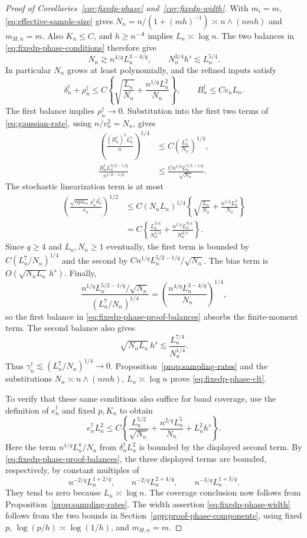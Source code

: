 \documentclass[10pt]{book}
\numberwithin{equation}{section}
\begin{document}
\begin{proof}[Proof of Corollaries~\ref{cor:fixedp-phase} and~\ref{cor:fixedp-width}]
With $m_i=m$, \eqref{eq:effective-sample-size} gives
$N_n=n/(1+(mh)^{-1})\asymp n\wedge(nmh)$ and $m_{H,n}=m$.
Also $K_n\le C$, and $h\ge n^{-A}$ implies $L_n\asymp\log n$.
The two balances in \eqref{eq:fixedp-phase-conditions} therefore give
\begin{equation}
N_n\gtrsim n^{4/q}L_n^{3-4/q},\qquad
N_n^{3/4}h^s\lesssim L_n^{5/4}.
\label{eq:fixedp-phase-proof-balances}
\end{equation}
In particular $N_n$ grows at least polynomially, and the refined inputs
satisfy
\[
\delta_n^\dagger+\rho_n^\dagger
\le C\left\{\sqrt{\frac{L_n}{N_n}}
+\frac{n^{1/q}L_n^2}{N_n}\right\},\qquad
B_n^\dagger\le Cv_nL_n.
\]
The first balance implies $\rho_n^\dagger\to0$.
Substitution into the first two terms of
\eqref{eq:gaussian-rate}, using $n/v_n^2=N_n$, gives
\begin{align*}
\left(\frac{(B_n^\dagger)^2L_n^5}{n}\right)^{1/4}
&\le C\left(\frac{L_n^7}{N_n}\right)^{1/4},\\
\frac{B_n^\dagger L_n^{3/2-1/q}}{n^{1/2-1/q}}
&\le\frac{Cn^{1/q}L_n^{5/2-1/q}}{\sqrt{N_n}}.
\end{align*}
The stochastic linearization term is at most
\[
\begin{aligned}
\left(\frac{\sqrt{npL_n}\,
\rho_n^\dagger\delta_n^\dagger}{v_n}\right)^{1/2}
&\le C(N_nL_n)^{1/4}
\left\{\sqrt{\frac{L_n}{N_n}}
+\frac{n^{1/q}L_n^2}{N_n}\right\}\\
&=C\left\{\frac{L_n^{3/4}}{N_n^{1/4}}
+\frac{n^{1/q}L_n^{9/4}}{N_n^{3/4}}\right\}.
\end{aligned}
\]
Since $q\ge4$ and $L_n,N_n\ge1$ eventually, the first term is bounded
by $C(L_n^7/N_n)^{1/4}$ and the second by
$Cn^{1/q}L_n^{5/2-1/q}/\sqrt{N_n}$. The bias term is
$O(\sqrt{N_nL_n}\,h^s)$. Finally,
\[
\frac{n^{1/q}L_n^{5/2-1/q}/\sqrt{N_n}}
{(L_n^7/N_n)^{1/4}}
=\left(\frac{n^{4/q}L_n^{3-4/q}}{N_n}\right)^{1/4},
\]
so the first balance in \eqref{eq:fixedp-phase-proof-balances} absorbs
the finite-moment term. The second balance also gives
\[
\sqrt{N_nL_n}\,h^s
\lesssim\frac{L_n^{7/4}}{N_n^{1/4}}.
\]
Thus $\gamma_n^\dagger\lesssim(L_n^7/N_n)^{1/4}\to0$.
Proposition~\ref{prop:sampling-rates} and the substitutions
$N_n\asymp n\wedge(nmh)$, $L_n\asymp\log n$ prove
\eqref{eq:fixedp-phase-clt}.

To verify that these same conditions also suffice for band coverage,
use the definition of $e_n^\dagger$ and fixed $p,K_n$ to obtain
\[
e_n^\dagger L_n^2\le C\left\{
\frac{L_n^{5/2}}{\sqrt{N_n}}
+\frac{n^{2/q}L_n^5}{N_n}+L_n^2h^s\right\}.
\]
Here the term $n^{1/q}L_n^4/N_n$ from
$\delta_n^\dagger L_n^2$ is bounded by the displayed second term.
By \eqref{eq:fixedp-phase-proof-balances}, the three displayed terms
are bounded, respectively, by constant multiples of
\[
n^{-2/q}L_n^{1+2/q},\qquad
n^{-2/q}L_n^{2+4/q},\qquad
n^{-3/q}L_n^{1+3/q}.
\]
They tend to zero because $L_n\asymp\log n$. The coverage conclusion
now follows from Proposition~\ref{prop:sampling-rates}.
The width assertion \eqref{eq:fixedp-phase-width} follows from the two
bounds in Section~\ref{app:proof-phase-components}, using fixed $p$,
$\log(p/h)\asymp\log(1/h)$, and $m_{H,n}=m$.


\end{proof}
\end{document}

